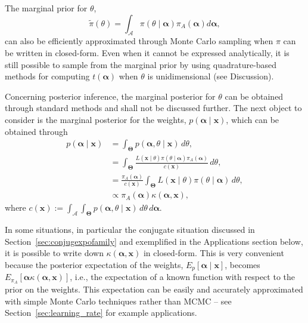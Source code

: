 \documentclass[12pt]{article}
\begin{document}
The marginal prior for $\theta$,
\begin{equation}
\label{eq:marginalbeta}
\tilde{\pi}(\theta) = \int_{\mathcal{A}} \pi(\theta \mid \boldsymbol\alpha) \pi_A(\boldsymbol\alpha)d\boldsymbol\alpha,
\end{equation}
can also be efficiently approximated through Monte Carlo sampling when $\pi$ can be written in closed-form.
Even when it cannot be expressed analytically, it is still possible to sample from the marginal prior by using quadrature-based methods for computing $t(\boldsymbol\alpha)$ when $\theta$ is unidimensional (see Discussion).

Concerning posterior inference, the marginal posterior for $\theta$ can be obtained through standard methods and shall not be discussed further.
The next object to consider is the marginal posterior for the weights, $p(\boldsymbol\alpha \mid \boldsymbol{x})$, which can be obtained through
\begin{align}
\nonumber
 p(\boldsymbol\alpha \mid \boldsymbol{x}) &= \int_{\boldsymbol\Theta} p(\boldsymbol\alpha, \theta \mid \boldsymbol{x})\,d\theta, \\
 \nonumber
 &= \int_{\boldsymbol\Theta} \frac{L(\boldsymbol{x} \mid \theta) \pi(\theta \mid \boldsymbol\alpha)\pi_A(\boldsymbol\alpha)}{c(\boldsymbol{x})}\,d\theta,\\
 \nonumber
 &= \frac{\pi_A(\boldsymbol\alpha)}{c(\boldsymbol{x})} \int_{\boldsymbol\Theta} L(\boldsymbol{x} \mid \theta) \pi(\theta \mid \boldsymbol\alpha)\,d\theta,\\
 \label{eq:marginal_posterior_alpha}
 &\propto \pi_A(\boldsymbol\alpha) \kappa(\boldsymbol\alpha, \boldsymbol{x}),
\end{align}
where $c(\boldsymbol{x}) := \int_{\mathcal{A}}\int_{\boldsymbol\Theta} p(\boldsymbol\alpha, \theta \mid \boldsymbol{x})\,d\theta\,d\boldsymbol{\alpha}$.

In some situations, in particular the conjugate situation discussed in Section~\ref{sec:conjugexpofamily} and exemplified in the Applications section below, it is possible to write down $\kappa(\boldsymbol\alpha, \boldsymbol{x})$ in closed-form.
This is very convenient because the posterior expectation of the weights, $E_p[\boldsymbol\alpha \mid \boldsymbol{x}]$, becomes $E_{\pi_A}[\boldsymbol\alpha \kappa(\boldsymbol\alpha, \boldsymbol{x})]$, i.e., the expectation of a known function with respect to the prior on the weights.
This expectation can be easily and accurately approximated with simple Monte Carlo techniques rather than MCMC -- see Section~\ref{sec:learning_rate} for example applications.
\end{document}

